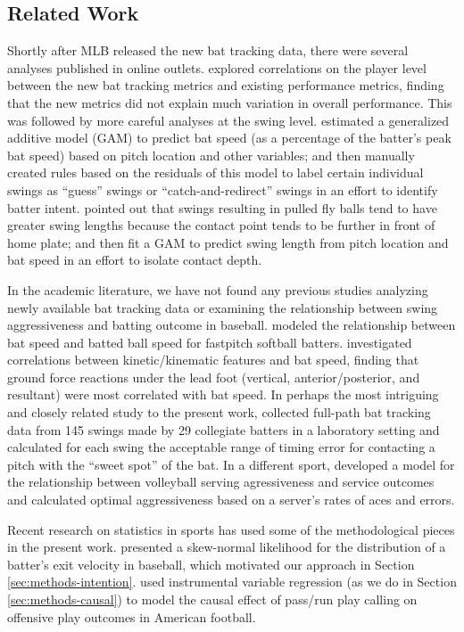 \documentclass{article}
\begin{document}
    \subsection{Related Work}
    \label{sec:related-work}

      Shortly after MLB released the new bat tracking data, there were several analyses published in online outlets. \citet{clemens_what_2024} explored correlations on the player level between the new bat tracking metrics and existing performance metrics, finding that the new metrics did not explain much variation in overall performance. This was followed by more careful analyses at the swing level. \citet{woodward_radar_2024} estimated a generalized additive model (GAM) to predict bat speed (as a percentage of the batter's peak bat speed) based on pitch location and other variables; and then manually created rules based on the residuals of this model to label certain individual swings as ``guess'' swings or ``catch-and-redirect'' swings in an effort to identify batter intent. \cite{orr_defense_2024} pointed out that swings resulting in pulled fly balls tend to have greater swing lengths because the contact point tends to be further in front of home plate; and then fit a GAM to predict swing length from pitch location and bat speed in an effort to isolate contact depth.

      In the academic literature, we have not found any previous studies analyzing newly available bat tracking data or examining the relationship between swing aggressiveness and batting outcome in baseball. \citet{nevins_sensitivity_2019} modeled the relationship between bat speed and batted ball speed for fastpitch softball batters. \citet{orishimo_lower_2024} investigated correlations between kinetic/kinematic features and bat speed, finding that ground force reactions under the lead foot (vertical, anterior/posterior, and resultant) were most correlated with bat speed. In perhaps the most intriguing and closely related study to the present work, \citet{nakashima_acceptable_2025} collected full-path bat tracking data from 145 swings made by 29 collegiate batters in a laboratory setting and calculated for each swing the acceptable range of timing error for contacting a pitch with the ``sweet spot'' of the bat. In a different sport, \citet{burton_linear_2015} developed a model for the relationship between volleyball serving agressiveness and service outcomes and calculated optimal aggressiveness based on a server's rates of aces and errors.

      Recent research on statistics in sports has used some of the methodological pieces in the present work. \citet{judge_exit_2024} presented a skew-normal likelihood for the distribution of a batter's exit velocity in baseball, which motivated our approach in Section \ref{sec:methods-intention}. \citet{putman_tackling_2025} used instrumental variable regression (as we do in Section \ref{sec:methods-causal}) to model the causal effect of pass/run play calling on offensive play outcomes in American football.
\end{document}
